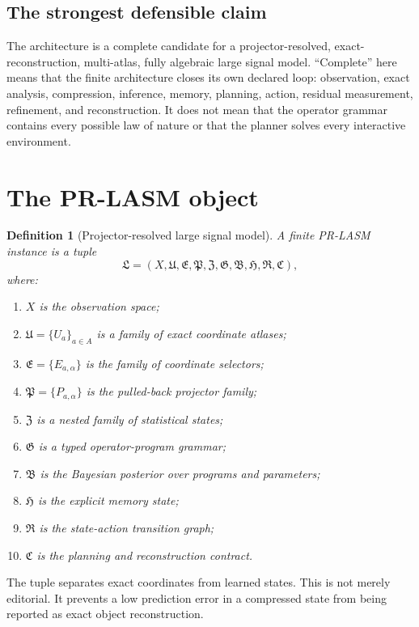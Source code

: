 \documentclass[11pt]{article}
\newtheorem{definition}{Definition}[section]
\theoremstyle{remark}
\begin{document}
\subsection{The strongest defensible claim}

The architecture is a complete candidate for a projector-resolved, exact-reconstruction, multi-atlas, fully algebraic large signal model.  ``Complete'' here means that the finite architecture closes its own declared loop: observation, exact analysis, compression, inference, memory, planning, action, residual measurement, refinement, and reconstruction.  It does not mean that the operator grammar contains every possible law of nature or that the planner solves every interactive environment.

\section{The PR-LASM object}

\begin{definition}[Projector-resolved large signal model]
A finite PR-LASM instance is a tuple
\[
\mathfrak L=
(X,\mathfrak U,\mathfrak E,\mathfrak P,\mathfrak Z,
\mathfrak G,\mathfrak B,\mathfrak H,\mathfrak R,\mathfrak C),
\]
where:
\begin{enumerate}
\item $X$ is the observation space;
\item $\mathfrak U=\{U_a\}_{a\in A}$ is a family of exact coordinate atlases;
\item $\mathfrak E=\{E_{a,\alpha}\}$ is the family of coordinate selectors;
\item $\mathfrak P=\{P_{a,\alpha}\}$ is the pulled-back projector family;
\item $\mathfrak Z$ is a nested family of statistical states;
\item $\mathfrak G$ is a typed operator-program grammar;
\item $\mathfrak B$ is the Bayesian posterior over programs and parameters;
\item $\mathfrak H$ is the explicit memory state;
\item $\mathfrak R$ is the state-action transition graph;
\item $\mathfrak C$ is the planning and reconstruction contract.
\end{enumerate}
\end{definition}

The tuple separates exact coordinates from learned states.  This is not merely editorial.  It prevents a low prediction error in a compressed state from being reported as exact object reconstruction.
\end{document}
